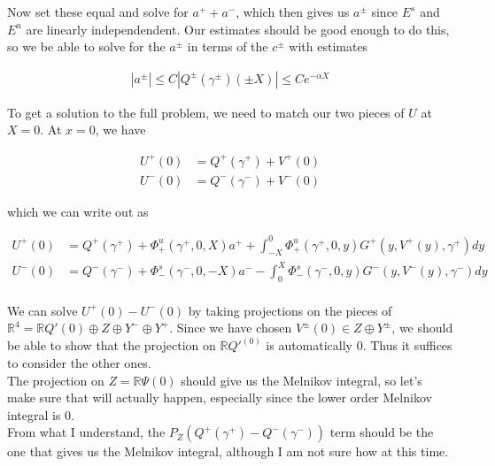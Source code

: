 \documentclass[12pt]{article}
\def\R{{\mathbb R}}
\begin{document}
Now set these equal and solve for $a^+ + a^-$, which then gives us $a^\pm$ since $E^s$ and $E^u$ are linearly independendent. Our estimates should be good enough to do this, so we be able to solve for the $a^\pm$ in terms of the $c^\pm$ with estimates

\begin{align*}
|a^\pm| \leq C |Q^\pm(\gamma^\pm)(\pm X)| \leq C e^{-\alpha X}
\end{align*}

To get a solution to the full problem, we need to match our two pieces of $U$ at $X = 0$. At $x = 0$, we have

\begin{align*}
U^+(0) &= Q^+(\gamma^+) + V^+(0) \\
U^-(0) &= Q^-(\gamma^-) + V^-(0)
\end{align*}

which we can write out as

\begin{align*}
U^+(0) &= Q^+(\gamma^+) + \Phi^u_+(\gamma^+, 0, X) a^+ + \int_{-X}^0 \Phi_+^u(\gamma^+, 0, y) G^+(y, V^+(y),\gamma^+)dy \\
U^-(0) &= Q^-(\gamma^-) + \Phi^s_-(\gamma^-, 0, -X) a^- - \int_0^X \Phi_-^s(\gamma^-, 0, y) G^-(y, V^-(y),\gamma^-)dy \\
\end{align*}

We can solve $U^+(0) - U^-(0)$ by taking projections on the pieces of $\R^4 = \R Q'(0) \oplus Z \oplus Y^- \oplus Y^+$. Since we have chosen $V^\pm(0) \in Z \oplus Y^\pm$, we should be able to show that the projection on $\R Q'^(0)$ is automatically 0. Thus it suffices to consider the other ones.\\

The projection on $Z = \R \Psi(0)$ should give us the Melnikov integral, so let's make sure that will actually happen, especially since the lower order Melnikov integral is 0.\\

From what I understand, the $P_Z( Q^+(\gamma^+) - Q^-(\gamma^-) )$ term should be the one that gives us the Melnikov integral, although I am not sure how at this time.
\end{document}
